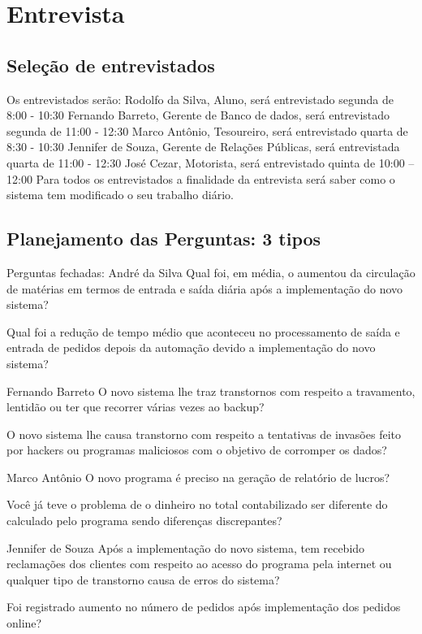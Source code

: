                
\section{Entrevista}

  \subsection{Seleção de entrevistados}
  Os entrevistados serão:
Rodolfo da Silva, Aluno, será entrevistado segunda de 8:00 - 10:30
Fernando Barreto, Gerente de Banco de dados, será entrevistado segunda de 11:00 - 12:30
Marco Antônio, Tesoureiro, será entrevistado quarta de 8:30 - 10:30
Jennifer de Souza, Gerente de Relações Públicas, será entrevistada quarta de 11:00 - 12:30
José Cezar, Motorista, será entrevistado quinta de 10:00 – 12:00
Para todos os entrevistados a finalidade da entrevista será saber como o sistema tem modificado o seu trabalho diário.
 
 \subsection{Planejamento das Perguntas: 3 tipos}
 Perguntas fechadas:
		André da Silva
Qual foi, em média, o aumentou da circulação de matérias em termos de entrada e saída diária após a implementação do novo sistema?

Qual foi a redução de tempo médio que aconteceu no processamento de saída e entrada de pedidos depois da automação devido a implementação do novo sistema?

Fernando Barreto
O novo sistema lhe traz transtornos com respeito a travamento, lentidão ou ter que recorrer várias vezes ao backup?

O novo sistema lhe causa transtorno com respeito a tentativas de invasões feito por hackers ou programas maliciosos com o objetivo de corromper os dados?

Marco Antônio
O novo programa é preciso na geração de relatório de lucros?

Você já teve o problema de o dinheiro no total contabilizado ser diferente do calculado pelo programa sendo diferenças discrepantes?

Jennifer de Souza
Após a implementação do novo sistema, tem recebido reclamações dos clientes com respeito ao acesso do programa pela internet ou qualquer tipo de transtorno causa de erros do sistema?

Foi registrado aumento no número de pedidos após implementação dos pedidos online?

